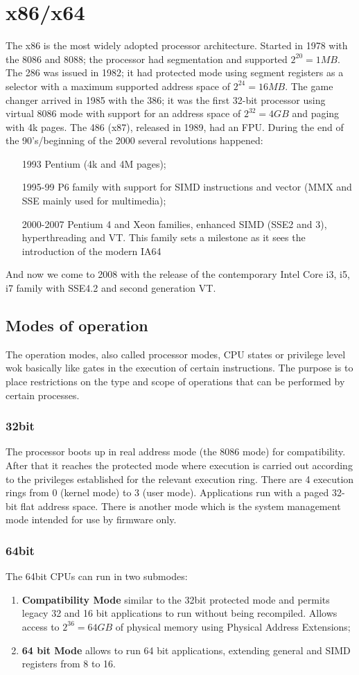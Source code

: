 \documentclass[paper=a4, fontsize=11pt]{report} %
\numberwithin{equation}{section} %
\numberwithin{figure}{section} %
\numberwithin{table}{section} %
\begin{document}
\section{x86/x64}
The x86 is the most widely adopted processor architecture. Started in 1978 with 
the 8086 and 8088; the processor had segmentation and supported $2^{20} = 1MB$.
The 286 was issued in 1982; it had protected mode using segment registers as a 
selector with a maximum supported address space of $2^{24} = 16MB$. The game 
changer arrived in 1985 with the 386; it was the first 32-bit processor using 
virtual 8086 mode with support for an address space of $2^{32} = 4GB$ and 
paging with 4k pages. The 486 (x87), released in 1989, had an FPU. During the 
end of the 90's/beginning of the 2000 several revolutions happened:
\begin{itemize}
    \item[1993] Pentium (4k and 4M pages);
    \item[1995-99] P6 family with support for SIMD instructions and vector (MMX 
    and SSE mainly used for multimedia);
    \item[2000-2007] Pentium 4 and Xeon families, enhanced SIMD (SSE2 and 3), 
    hyperthreading and VT. This family sets a milestone as it sees the 
    introduction of the modern IA64
\end{itemize}
And now we come to 2008 with the release of the contemporary Intel Core i3, i5, 
i7 family with SSE4.2 and second generation VT.
\subsection{Modes of operation}
The operation modes, also called processor modes, CPU states or privilege level 
wok basically like gates in the execution of certain instructions. The purpose 
is to place restrictions on the type and scope of operations that can be 
performed by certain processes.
\subsubsection{32bit}
The processor boots up in real address mode (the 8086 mode) for compatibility. 
After that it reaches the protected mode where execution is carried out 
according to the privileges established for the relevant execution ring. There 
are 4 execution rings from 0 (kernel mode) to 3 (user mode). Applications run 
with a paged 32-bit flat address space. There is another mode which is the 
system management mode intended for use by firmware only.
\subsubsection{64bit}
The 64bit CPUs can run in two submodes:
\begin{enumerate}
	\item \textbf{Compatibility Mode} similar to the 32bit protected mode and 
	permits legacy 32 and 16 bit applications to run without being recompiled. 
	Allows access to $2^{36} = 64GB$ of physical memory using Physical Address 
	Extensions;
	\item \textbf{64 bit Mode} allows to run 64 bit applications, extending 
	general and SIMD registers from 8 to 16.
\end{enumerate}
\end{document}
